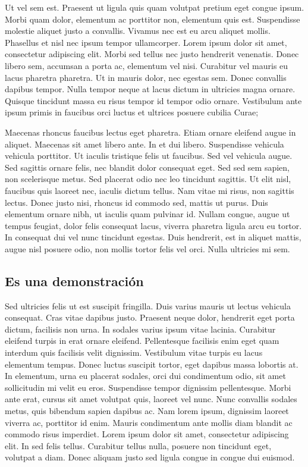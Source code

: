 \documentclass[11pt, a4paper]{report}
\begin{document}
Ut vel sem est. Praesent ut ligula quis quam volutpat pretium eget congue ipsum. Morbi quam dolor, elementum ac porttitor non, elementum quis est. Suspendisse molestie aliquet justo a convallis. Vivamus nec est eu arcu aliquet mollis. Phasellus et nisl nec ipsum tempor ullamcorper. Lorem ipsum dolor sit amet, consectetur adipiscing elit. Morbi sed tellus nec justo hendrerit venenatis. Donec libero sem, accumsan a porta ac, elementum vel nisi. Curabitur vel mauris eu lacus pharetra pharetra. Ut in mauris dolor, nec egestas sem. Donec convallis dapibus tempor. Nulla tempor neque at lacus dictum in ultricies magna ornare. Quisque tincidunt massa eu risus tempor id tempor odio ornare. Vestibulum ante ipsum primis in faucibus orci luctus et ultrices posuere cubilia Curae;

Maecenas rhoncus faucibus lectus eget pharetra. Etiam ornare eleifend augue in aliquet. Maecenas sit amet libero ante. In et dui libero. Suspendisse vehicula vehicula porttitor. Ut iaculis tristique felis ut faucibus. Sed vel vehicula augue. Sed sagittis ornare felis, nec blandit dolor consequat eget. Sed sed sem sapien, non scelerisque metus. Sed placerat odio nec leo tincidunt sagittis. Ut elit nisl, faucibus quis laoreet nec, iaculis dictum tellus. Nam vitae mi risus, non sagittis lectus. Donec justo nisi, rhoncus id commodo sed, mattis ut purus. Duis elementum ornare nibh, ut iaculis quam pulvinar id. Nullam congue, augue ut tempus feugiat, dolor felis consequat lacus, viverra pharetra ligula arcu eu tortor. In consequat dui vel nunc tincidunt egestas. Duis hendrerit, est in aliquet mattis, augue nisl posuere odio, non mollis tortor felis vel orci. Nulla ultricies mi sem.





\subsection{Es una demonstración}


Sed ultricies felis ut est suscipit fringilla. Duis varius mauris ut lectus vehicula consequat. Cras vitae dapibus justo. Praesent neque dolor, hendrerit eget porta dictum, facilisis non urna. In sodales varius ipsum vitae lacinia. Curabitur eleifend turpis in erat ornare eleifend. Pellentesque facilisis enim eget quam interdum quis facilisis velit dignissim. Vestibulum vitae turpis eu lacus elementum tempus. Donec luctus suscipit tortor, eget dapibus massa lobortis at. In elementum, urna eu placerat sodales, orci dui condimentum odio, sit amet sollicitudin mi velit eu eros. Suspendisse tempor dignissim pellentesque. Morbi ante erat, cursus sit amet volutpat quis, laoreet vel nunc. Nunc convallis sodales metus, quis bibendum sapien dapibus ac. Nam lorem ipsum, dignissim laoreet viverra ac, porttitor id enim. Mauris condimentum ante mollis diam blandit ac commodo risus imperdiet. Lorem ipsum dolor sit amet, consectetur adipiscing elit. In sed felis tellus. Curabitur tellus nulla, posuere non tincidunt eget, volutpat a diam. Donec aliquam justo sed ligula congue in congue dui euismod.
\end{document}
